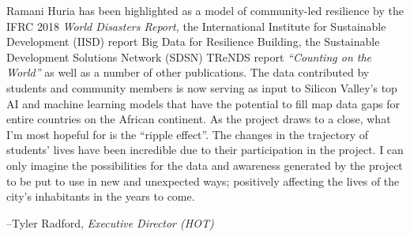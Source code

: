 \documentclass[a4paper,12pt,twoside]{article}
\begin{document}
\begin{multicols}{2}
Ramani Huria has been highlighted as a model of community-led resilience by the IFRC 2018 \textit{World Disasters Report,} the International Institute for Sustainable Development (IISD) report Big Data for Resilience Building, the Sustainable Development Solutions Network (SDSN) TReNDS report \textit{“Counting on the World”} as well as a number of other publications. The data contributed by students and community members is now serving as input to Silicon Valley’s top AI and machine learning models that have the potential to fill map data gaps for entire countries on the African continent. As the project draws to a close, what I’m most hopeful for is the “ripple effect”. The changes in the trajectory of students’ lives have been incredible due to their participation in the project. I can only imagine the possibilities for the data and awareness generated by the project to be put to use in new and unexpected ways; positively affecting the lives of the city’s inhabitants in the years to come.

\end{multicols}

--Tyler Radford, \textit{Executive Director (HOT)}

\clearpage

\newpage
\end{document}
